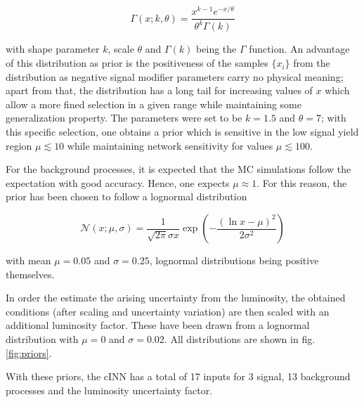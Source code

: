 \begin{equation*}
	\Gamma(x; k, \theta) = \frac{x^{k-1}e^{-x/\theta}}{\theta^k\Gamma(k)}
\end{equation*}

with shape parameter $k$, scale $\theta$ and $\Gamma(k)$ being the $\Gamma$ function. An advantage of this distribution as prior is the positiveness of the samples $\{x_i\}$ from the distribution as negative signal modifier parameters carry no physical meaning; apart from that, the distribution has a long tail for increasing values of $x$ which allow a more fined selection in a given range while maintaining some generalization property. The parameters were set to be $k = 1.5$ and $\theta = 7$; with this specific selection, one obtains a prior which is sensitive in the low signal yield region $\mu \lesssim 10$ while maintaining network sensitivity for values $\mu\lesssim100$.

For the background processes, it is expected that the MC simulations follow the expectation with good accuracy. Hence, one expects $\mu \approx 1$. For this reason, the prior has been chosen to follow a lognormal distribution

\begin{equation*}
	\mathcal{N}(x; \mu, \sigma) = \frac{1}{\sqrt{2\pi }\sigma x}\exp\left(-\frac{\left(\ln x-\mu\right)^2}{2\sigma^2}\right)
\end{equation*}

with mean $\mu = 0.05$ and $\sigma = 0.25$, lognormal distributions being positive themselves.

In order the estimate the arising uncertainty from the luminosity, the obtained conditions (after scaling and uncertainty variation) are then scaled with an additional luminosity factor. These have been drawn from a lognormal distribution with $\mu = 0$ and $\sigma = 0.02$. All distributions are shown in fig. \ref{fig:priors}.

With these priors, the cINN has a total of 17 inputs for 3 signal, 13 background processes and the luminosity uncertainty factor.

